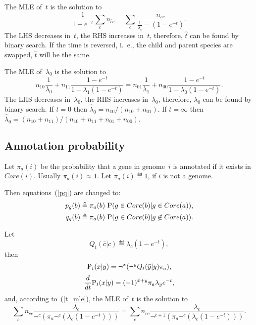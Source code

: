 \documentclass[10pt,a4paper]{article}
\theoremstyle{plain} \newtheorem{Lem}{Lemma}
\begin{document}
The MLE of~$t$ is the solution to
$$ \frac 1 {1 - e^{-t}} \sum_c n_{\bar c c} = \sum_c \frac {n_{cc}}  {\frac 1 {\lambda_c} - (1 - e^{-t})}. $$
The LHS decreases in~$t$, the RHS increases in~$t$, therefore, $\hat t$ can be found by binary search.
If the time is reversed, i.~e., the child and parent species are swapped, $\hat t$ will be the same.

The MLE of~$\lambda_0$ is the solution to
$$   n_{10} \frac 1 {\lambda_0} + n_{11} \frac {1 - e^{-t}} {1 - \lambda_1 (1 - e^{-t})}
   = n_{01} \frac 1 {\lambda_1} + n_{00} \frac {1 - e^{-t}} {1 - \lambda_0 (1 - e^{-t})}.
$$
The LHS decreases in~$\lambda_0$, the RHS increases in~$\lambda_0$, therefore, $\lambda_0$ can be found by binary search.
If $t=0$ then $\hat \lambda_0 = n_{10} / (n_{10} + n_{01})$.
If $t=\infty$ then $\hat \lambda_0 = (n_{10} + n_{11}) / (n_{10} + n_{11} + n_{01} + n_{00})$.



\subsection {Annotation probability}

Let $\pi_a(i)$ be the probability that a gene in genome~$i$ is annotated if it exists in $Core(i)$.
Usually $\pi_a(i) \approx 1$.
Let $\pi_a(i) \eqdef 1$, if $i$ is not a genome.

Then equations~(\ref{pq}) are changed to:
\begin{equation*}
\begin{split}
p_g(b) &\eqdef \pi_a(b) \ \P (g \in Core(b) | g \in Core(a)), \\
q_g(b) &\eqdef \pi_a(b) \ \P (g \in Core(b) | g \not \in Core(a)).
\end{split}
\end{equation*}


Let
$$ Q_t(\bar c|c) \eqdef \lambda_c \left(1 -  e^{-t} \right), $$
then
$$ \P_t(x|y) = \neg^{\bar x} (\neg^y Q_t(\bar y|y) \pi_a), $$
$$ \frac d {dt} \P_t(x|y) = (-1)^{\bar x + y} \pi_a \lambda_y e^{-t}, $$
and, according to~(\ref{t_mle}), the MLE of~$t$ is the solution to
$$   \sum_c n_{\bar c c} \frac {\lambda_c} {\neg^c (\pi_a \neg^c (\lambda_c (1 - e^{-t}))) }
   = \sum_c n_{c c} \frac {\lambda_c} {\neg^{c+1} (\pi_a \neg^c (\lambda_c (1 - e^{-t}))) }. $$
\end{document}
